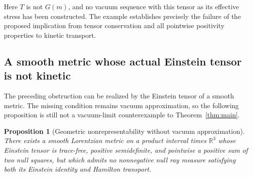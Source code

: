 \documentclass[11pt,a4paper]{article}
\numberwithin{equation}{section}
\newcommand{\R}{\mathbb R}
\newtheorem{proposition}[theorem]{Proposition}
\theoremstyle{definition}
\begin{document}
Here $T$ is not $G(m)$, and no vacuum sequence with this tensor as its effective stress has been constructed. The example establishes precisely the failure of the proposed implication from tensor conservation and all pointwise positivity properties to kinetic transport.

\subsection{A smooth metric whose actual Einstein tensor is not kinetic}

The preceding obstruction can be realized by the Einstein tensor of a smooth metric. The missing condition remains vacuum approximation, so the following proposition is still not a vacuum-limit counterexample to Theorem~\ref{thm:main}.

\begin{proposition}[Geometric nonrepresentability without vacuum approximation]\label{prop:bianchi}
There exists a smooth Lorentzian metric on a product interval times $\R^3$ whose Einstein tensor is trace-free, positive semidefinite, and pointwise a positive sum of two null squares, but which admits no nonnegative null ray measure satisfying both its Einstein identity and Hamilton transport.
\end{proposition}
\end{document}
